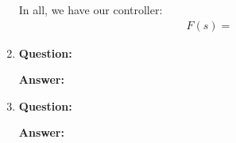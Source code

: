 \begin{enumerate}
	\par In all, we have our controller:
	\begin{align*}
		F(s) = 
	\end{align*}
	
	\item \textbf{Question:} 
	\par \textbf{Answer:}
	
	\item \textbf{Question:} 
	\par \textbf{Answer:} 
\end{enumerate}